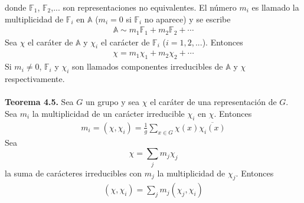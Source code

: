 \documentclass[12pt]{book}
\theoremstyle{definition}
\newcounter{in}
\begin{document}
donde $\mathbb{F}_{1}$, $\mathbb{F}_{2}$,... son representaciones no equivalentes. El número $m_{i}$ es llamado la multiplicidad de $\mathbb{F}_{i}$ en $\mathbb{A}$ ($m_{i}=0$ si $\mathbb{F}_{i}$ no aparece) y se escribe 
\begin{equation*}
\begin{aligned}
\mathbb{A} \sim m_{1} \mathbb{F}_{1}+m_{2} \mathbb{F}_{2}+ \cdots
\end{aligned}
\end{equation*}
Sea $\chi$ el caráter de $\mathbb{A}$ y $\chi_{i}$ el carácter de $\mathbb{F}_{i}$ ($i = 1, 2, ...$). Entonces
\begin{equation*}
\begin{aligned}
\chi =m_{1} \chi_{1}+ m_{2} \chi_{2}+ \cdots
\end{aligned}
\end{equation*}
Si $m_{i} \neq 0$, $\mathbb{F}_{i}$ y $\chi_{i}$ son llamados componentes irreducibles de $\mathbb{A}$ y $\chi$ respectivamente.\\~\\
\textbf{Teorema 4.5. } Sea $G$ un grupo y sea $\chi$ el caráter de una representación de $G$. Sea $m_{i}$ la multiplicidad de un carácter irreducible $\chi_{i}$ en $\chi$. Entonces
\begin{equation*}
\begin{aligned}
m_{i} = (\chi,\chi_{i}) = \frac{1}{g} \sum_{x \in G} \chi(x) \overline{\chi_{i}(x)}
\end{aligned}
\end{equation*}
Sea $$\chi=\sum_{j} m_{j} \chi_{j}$$ la suma de carácteres irreducibles con $m_{j}$ la multiplicidad de $\chi_{j}$. Entonces
\begin{equation*}
\begin{aligned}
(\chi,\chi_{i}) = \sum_{j} m_{j} (\chi_{j},\chi_{i})
\end{aligned}
\end{equation*}

\backmatter




\printindex
\end{document}
